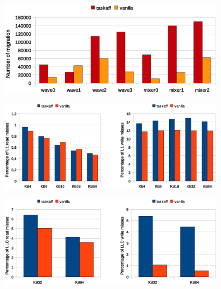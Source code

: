 \begin{figure}[htbp]
\centering
\includegraphics[width=\widefigure]{images/results_xeon/migration_xeon.eps}
\caption{}
\label{fig:migration_xeon}
\end{figure}

\begin{figure}[htbp]
\centering
\includegraphics[width=\widefigure]{images/results_xeon/l1_load_store_xeon.eps}
\caption{}
\label{fig:l1_load_store_xeon}
\end{figure}

\begin{figure}[htbp]
\centering
\includegraphics[width=\widefigure]{images/results_xeon/l2_load_store_xeon.eps}
\caption{}
\label{fig:l2_load_store_xeon}
\end{figure}

